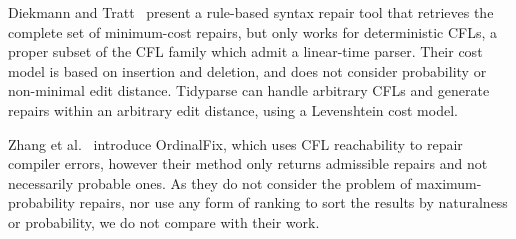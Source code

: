 \documentclass[sigplan,review,acmsmall,nonacm,screen,anonymous]{acmart}\settopmatter{printfolios=false,printccs=false,printacmref=false}
\begin{document}
Diekmann and Tratt~\cite{diekmann2018dont} present a rule-based syntax repair tool that retrieves the complete set of minimum-cost repairs, but only works for deterministic CFLs, a proper subset of the CFL family which admit a linear-time parser. Their cost model is based on insertion and deletion, and does not consider probability or non-minimal edit distance. Tidyparse can handle arbitrary CFLs and generate repairs within an arbitrary edit distance, using a Levenshtein cost model.

Zhang et al.~\cite{zhang2023ordinalfix} introduce OrdinalFix, which uses CFL reachability to repair compiler errors, however their method only returns admissible repairs and not necessarily probable ones. As they do not consider the problem of maximum-probability repairs, nor use any form of ranking to sort the results by naturalness or probability, we do not compare with their work.

%
\end{document}
